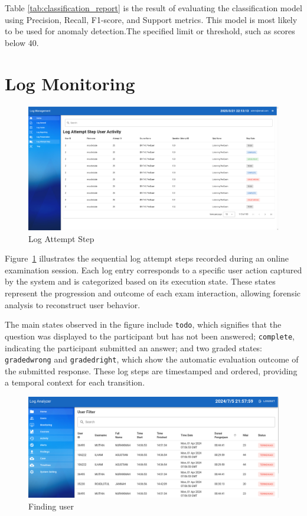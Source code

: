 Table \ref{tab:classification_report} is the result of evaluating the classification model using Precision, Recall, F1-score, and Support metrics. This model is most likely to be used for anomaly detection.The specified limit or threshold, such as scores below 40.

\section{Log Monitoring}

\begin{figure}[H] 
    \centering
    \includegraphics[width=14cm]{figure/log_attempt_step.png}
    \caption{Log Attempt Step}
    \label{fig:log-attempt-step}
\end{figure}
Figure~\ref{fig:log-attempt-step} illustrates the sequential log attempt steps recorded during an online examination session. Each log entry corresponds to a specific user action captured by the system and is categorized based on its execution state. These states represent the progression and outcome of each exam interaction, allowing forensic analysis to reconstruct user behavior.

The main states observed in the figure include \texttt{todo}, which signifies that the question was displayed to the participant but has not been answered; \texttt{complete}, indicating the participant submitted an answer; and two graded states: \texttt{gradedwrong} and \texttt{gradedright}, which show the automatic evaluation outcome of the submitted response. These log steps are timestamped and ordered, providing a temporal context for each transition.
\begin{figure}[H] 
    \centering
    \includegraphics[width=14cm]{figure/findings_20240809_215805.png}
    \caption{Finding user}
    \label{fig:findings-user}
\end{figure}

